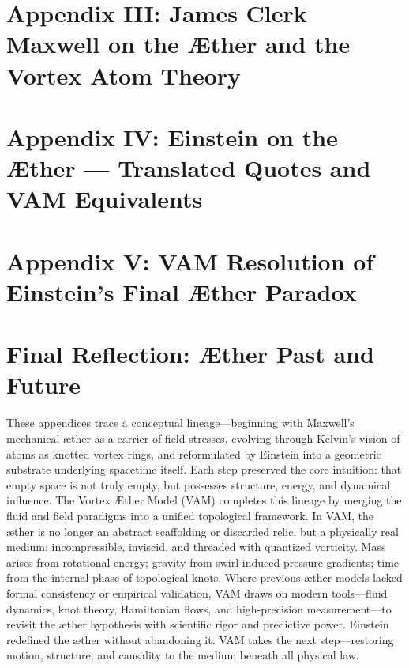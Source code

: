 \documentclass[preprint,titlepage]{revtex4-2}
\begin{document}
        \section*{Appendix III: James Clerk Maxwell on the Æther and the Vortex Atom Theory}
            \label{appendix:maxwell}
            

        \section*{Appendix IV: Einstein on the Æther — Translated Quotes and VAM Equivalents}
            \label{appendix:einstein}
            

        \section*{Appendix V: VAM Resolution of Einstein’s Final Æther Paradox}
            \label{appendix:final-aether}
            


        \section*{Final Reflection: Æther Past and Future}
            These appendices trace a conceptual lineage—beginning with Maxwell's mechanical æther as a carrier of field stresses, evolving through Kelvin's vision of atoms as knotted vortex rings, and reformulated by Einstein into a geometric substrate underlying spacetime itself. Each step preserved the core intuition: that empty space is not truly empty, but possesses structure, energy, and dynamical influence.
            The Vortex Æther Model (VAM) completes this lineage by merging the fluid and field paradigms into a unified topological framework. In VAM, the æther is no longer an abstract scaffolding or discarded relic, but a physically real medium: incompressible, inviscid, and threaded with quantized vorticity. Mass arises from rotational energy; gravity from swirl-induced pressure gradients; time from the internal phase of topological knots.
            Where previous æther models lacked formal consistency or empirical validation, VAM draws on modern tools—fluid dynamics, knot theory, Hamiltonian flows, and high-precision measurement—to revisit the æther hypothesis with scientific rigor and predictive power.
            Einstein redefined the æther without abandoning it. VAM takes the next step—restoring motion, structure, and causality to the medium beneath all physical law.
\end{document}
